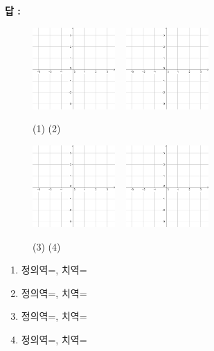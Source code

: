 \documentclass{oblivoir}
\newcounter{num}
\begin{document}
\textbf{답 :}
\begin{figure}[h!]
\centering
\includegraphics[width=0.28\textwidth]{pm3by3}
~
\includegraphics[width=0.28\textwidth]{pm3by3}
\par\noindent
(1)
\qquad\qquad\qquad\qquad\quad
(2)
\par\noindent
\includegraphics[width=0.28\textwidth]{pm3by3}
~
\includegraphics[width=0.28\textwidth]{pm3by3}
\par\noindent
(3)
\qquad\qquad\qquad\qquad\quad
(4)
\end{figure}
\begin{enumerate}
\item
정의역=\phantom{실수 전체 집합}, 치역=\phantom{실수 전체 집합}
\item
정의역=\phantom{실수 전체 집합}, 치역=\phantom{실수 전체 집합}
\item
정의역=\phantom{실수 전체 집합}, 치역=\phantom{실수 전체 집합}
\item
정의역=\phantom{실수 전체 집합}, 치역=\phantom{실수 전체 집합}
\end{enumerate}
\end{document}
